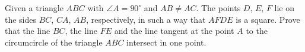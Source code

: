 Given a triangle $ ABC$ with $ \angle A = 90^{\circ}$ and $ AB \neq AC$. The points $ D$,  $ E$,  $ F$ lie on the sides $ BC$,  $ CA$,  $ AB$,  respectively, in such a way that $ AFDE$ is a square. Prove that the line $ BC$,  the line $ FE$ and the line tangent at the point $ A$ to the circumcircle of the triangle $ ABC$ intersect in one point.